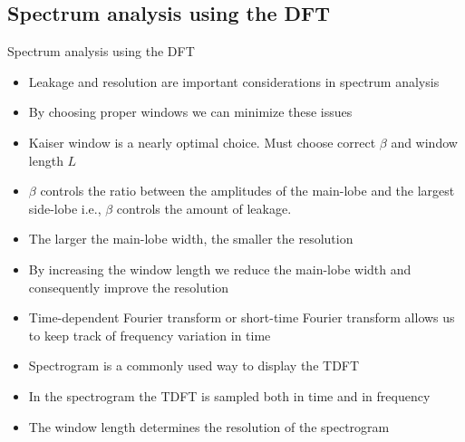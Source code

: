 \documentclass[10pt]{beamer}
\begin{document}
\subsection{Spectrum analysis using the DFT}
\begin{frame}{Spectrum analysis using the DFT}
\begin{itemize}
	\item Leakage and resolution are important considerations in spectrum analysis
	\item By choosing proper windows we can minimize these issues
	\item Kaiser window is a nearly optimal choice. Must choose correct $\beta$ and window length $L$
	\item $\beta$ controls the ratio between the amplitudes of the main-lobe and the largest side-lobe i.e., $\beta$ controls the amount of leakage.
	\item The larger the main-lobe width, the smaller the resolution
	\item By increasing the window length we reduce the main-lobe width and consequently improve the resolution
	\item Time-dependent Fourier transform or short-time Fourier transform allows us to keep track of frequency variation in time
	\item Spectrogram is a commonly used way to display the TDFT
	\item In the spectrogram the TDFT is sampled both in time and in frequency
	\item The window length determines the resolution of the spectrogram
\end{itemize}
\end{frame}
\end{document}
